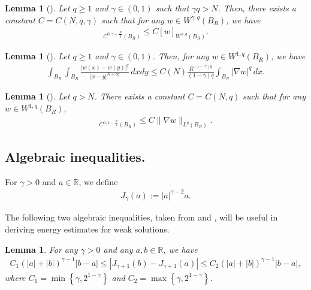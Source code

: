 \documentclass[reqno,10pt]{amsart}
\numberwithin{equation}{section}
\newtheorem{lemma}[theorem]{Lemma}
\begin{document}
\begin{lemma}[]
	\label{lemMorrey1}
	Let $q\ge1$ and $\gamma\in (0, 1)$ such that $\gamma q >N$. Then, there exists a constant $C=C(N, q, \gamma)$ such that for any $w\in W^{\gamma,q}(B_R)$, we have
	\begin{align*}
		[w]_{C^{0,\gamma-\frac{N}{q}}(B_R)}\le C[w]_{W^{\gamma, q}(B_R)}.
	\end{align*}
\end{lemma}

\begin{lemma}[]
	\label{embed}
	Let $q\ge1$ and $\gamma\in(0,1)$. Then, for any $w\in W^{1,q}(B_R)$, we have
	\begin{align}
		\label{embedd}
		\int_{B_R}\int_{B_R}\frac{|w(x)-w(y)|^q}{|x-y|^{N+\gamma q}}\,dxdy\le C(N)\frac{R^{(1-\gamma)q}}{(1-\gamma)q}\int_{B_R}|\nabla w|^q\,dx.
	\end{align}
\end{lemma}

\begin{lemma}[]
	\label{Morrey2}
	Let $q> N$. There exists a constant $C=C(N, q)$ such that for any $w\in W^{1,q}(B_R)$,
	\begin{align*}
		[w]_{C^{0,1-\frac{N}{q}}(B_R)}\le C\|\nabla w\|_{L^q(B_R)}.
	\end{align*}
\end{lemma}

\subsection{Algebraic inequalities.}
For $\gamma>0$ and $a\in\mathbb{R}$, we define
\begin{align*}
	J_\gamma(a):=|a|^{\gamma-2}a.
\end{align*}

The following two algebraic inequalities, taken from \cite{BDL2401} and \cite{BDL2402}, will be useful in deriving energy estimates for weak solutions.

\begin{lemma}
	\label{lem2}
	For any $\gamma>0$ and any $a,b\in \mathbb{R}$, we have
	\begin{align*}
		C_1\left( |a|+|b|\right) ^{\gamma-1}|b-a|\le \left| J_{\gamma+1}(b)-J_{\gamma+1}(a)\right| \le C_2\left( |a|+|b|\right) ^{\gamma-1}|b-a|,
	\end{align*}
	where $C_1=\min\left\lbrace \gamma,2^{1-\gamma}\right\rbrace $ and $C_2=\max\left\lbrace \gamma,2^{1-\gamma}\right\rbrace $.
\end{lemma}
\end{document}
